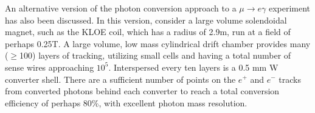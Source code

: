 An alternative version of the photon conversion approach to a $\mu \to e \gamma$ experiment has also been discussed. In this version, consider a large volume solendoidal magnet, such as the KLOE coil, which has a radius of 2.9m, run at a field of perhaps 0.25T. A large volume, low mass cylindrical drift chamber provides many ($\ge$100) layers of tracking, utilizing small cells and having a total number of sense wires approaching $10^5$. Interspersed every ten layers is a 0.5 mm W converter shell. There are a sufficient number of points on the $e^+$ and $e^-$ tracks from converted photons behind each converter to reach a total conversion efficiency of perhaps 80\%, with excellent photon mass resolution. 




